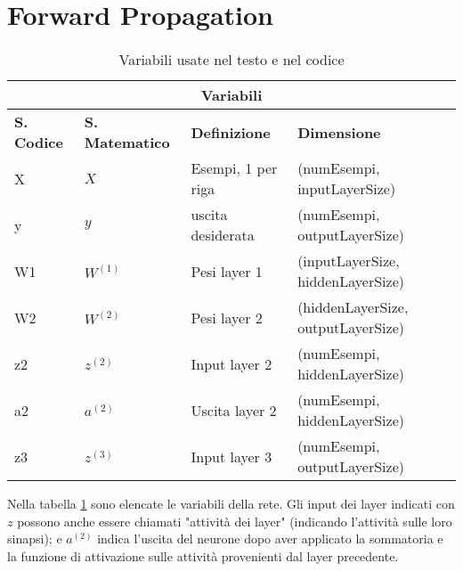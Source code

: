 \section{Forward Propagation}

\begin{table}[h!]
\caption{Variabili usate nel testo e nel codice}
\label{tab:variabili}
\begin{center}
\begin{tabular}{ |p{3cm}||p{3cm}|p{3cm}|p{3cm}|  }
 \hline
 \multicolumn{4}{|c|}{\textbf{Variabili}} \\
 \hline
 \textbf{S. Codice} & \textbf{S. Matematico} & \textbf{Definizione} & \textbf{Dimensione}\\
 \hline
 X	& $X$	&Esempi, 1 per riga&	\makecell{(numEsempi, \\inputLayerSize)}\\
 \hline
 y&	$y$	& uscita desiderata	& \makecell{(numEsempi, \\outputLayerSize)}\\
 \hline
 W1 & $W^{(1)}$	& Pesi layer 1&	\makecell{(inputLayerSize, \\hiddenLayerSize)}\\
 \hline
 W2	& $W^{(2)}$   & Pesi layer 2&	(hiddenLayerSize, outputLayerSize)\\
 \hline
 z2 & $z^{(2)}$	& Input layer 2& \makecell{(numEsempi, \\hiddenLayerSize)}\\
 \hline
 a2 & $a^{(2)}$	& Uscita layer 2& \makecell{(numEsempi, \\hiddenLayerSize)}\\
 \hline
 z3 & $z^{(3)}$	& Input layer 3& \makecell{(numEsempi, \\outputLayerSize)}\\
  \hline
 \end{tabular}
 \end{center}
 \end{table}
Nella tabella \ref{tab:variabili} sono elencate le variabili della rete. Gli input dei layer indicati con $z$ possono anche essere chiamati "attività dei layer" (indicando l'attività sulle loro sinapsi); e $a^{(2)}$ indica l'uscita del neurone dopo aver applicato la sommatoria e la funzione di attivazione sulle attività provenienti dal layer precedente.

